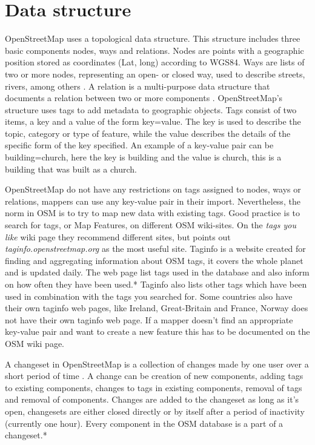 \section{Data structure}
OpenStreetMap uses a topological data structure. This structure includes three basic components nodes, ways and relations. Nodes are points with a geographic position stored as coordinates (Lat, long) according to WGS84. Ways are lists of two or more nodes, representing an open- or closed way, used to describe streets, rivers, among others \cite{Debruyne2015}. A relation is a multi-purpose data structure that documents a relation between two or more components \cite{OpenStreetMapg}. OpenStreetMap's structure uses tags to add metadata to geographic objects. Tags consist of two items, a key and a value of the form key=value. The key is used to describe the topic, category or type of feature, while the value describes the details of the specific form of the key specified. An example of a key-value pair can be building=church, here the key is building and the value is church, this is a building that was built as a church. 

OpenStreetMap do not have any restrictions on tags assigned to nodes, ways or relations, mappers can use any key-value pair in their import. Nevertheless, the norm in OSM is to try to map new data with existing tags. Good practice is to search for tags, or Map Features, on different OSM wiki-sites. On the \textit{tags you like} wiki page they recommend different sites, but points out \textit{taginfo.openstreetmap.org} as the most useful site. Taginfo is a website created for finding and aggregating information about OSM tags, it covers the whole planet and is updated daily. The web page list tags used in the database and also inform on how often they have been used.* %
 Taginfo also lists other tags which have been used in combination with the tags you searched for. Some countries also have their own taginfo web pages, like Ireland, Great-Britain and France, Norway does not have their own taginfo web page. If a mapper doesn't find an appropriate key-value pair and want to create a new feature this has to be documented on the OSM wiki page. 
 

A changeset in OpenStreetMap is a collection of changes made by one user over a short period of time \cite{OpenStreetMapi}.  A change can be creation of new components, adding tags to existing components, changes to tags in existing components, removal of tags and removal of components. Changes are added to the changeset as long as it's open, changesets are either closed directly or by itself after a period of inactivity (currently one hour). Every component in the OSM database is a part of a changeset.* %

